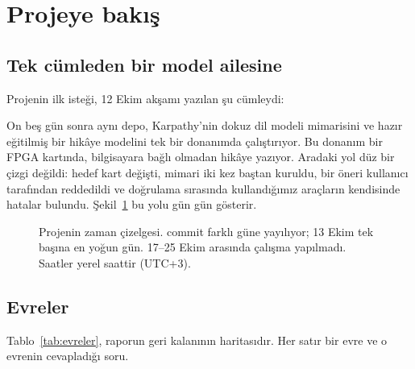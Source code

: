 \section{Projeye bakış}\label{sec:bakis}

\subsection{Tek cümleden bir model ailesine}

Projenin ilk isteği, 12 Ekim akşamı yazılan şu cümleydi:


On beş gün sonra aynı depo, Karpathy'nin dokuz dil modeli mimarisini ve hazır eğitilmiş bir hikâye modelini tek bir donanımda çalıştırıyor. Bu donanım bir FPGA kartında, bilgisayara bağlı olmadan hikâye yazıyor. Aradaki yol düz bir çizgi değildi: hedef kart değişti, mimari iki kez baştan kuruldu, bir öneri kullanıcı tarafından reddedildi ve doğrulama sırasında kullandığımız araçların kendisinde hatalar bulundu. Şekil~\ref{fig:zaman} bu yolu gün gün gösterir.

\begin{figure}[htb]
\centering
{}
\caption{Projenin zaman çizelgesi. \gCommits{} commit \gCommitDays{} farklı güne yayılıyor; 13 Ekim tek başına en yoğun gün. 17–25 Ekim arasında çalışma yapılmadı. Saatler yerel saattir (UTC+3).}
\label{fig:zaman}
\end{figure}

\subsection{Evreler}

Tablo~\ref{tab:evreler}, raporun geri kalanının haritasıdır. Her satır bir evre ve o evrenin cevapladığı soru.

